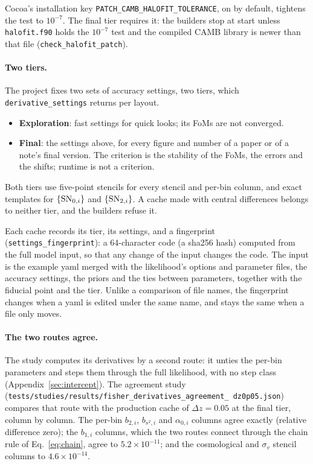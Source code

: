 \documentclass[11pt]{article}
\newcommand{\SNzi}{{\rm SN}_{0,i}}
\newcommand{\SNti}{{\rm SN}_{2,i}}
\newcommand{\us}{\_\allowbreak}
\begin{document}
Cocoa's installation key \texttt{PATCH\us CAMB\us HALOFIT\us TOLERANCE},
on by default, tightens the test to $10^{-7}$.  The final tier requires
it: the builders stop at start unless \texttt{halofit.f90} holds the
$10^{-7}$ test and the compiled CAMB library is newer than that file
(\texttt{check\us halofit\us patch}).

\paragraph{Two tiers.}
The project fixes two sets of accuracy settings, two tiers, which
\texttt{derivative\us settings} returns per layout.
\begin{itemize}
  \item \textbf{Exploration}: fast settings for quick looks; its FoMs
    are not converged.
  \item \textbf{Final}: the settings above, for every figure and number
    of a paper or of a note's final version.  The criterion is the
    stability of the FoMs, the errors and the shifts; runtime is not a
    criterion.
\end{itemize}
Both tiers use five-point stencils for every stencil and per-bin column,
and exact templates for $\{\SNzi\}$ and $\{\SNti\}$.
A cache made with central differences belongs to neither tier, and the
builders refuse it.

Each cache records its tier, its settings, and a fingerprint
(\texttt{settings\us fingerprint}): a 64-character code (a sha256 hash)
computed from the full model input, so that any change of the input
changes the code.  The input is the example yaml merged with the
likelihood's options and parameter files, the accuracy settings, the
priors and the ties between parameters, together with the fiducial point
and the tier.  Unlike a comparison of file names, the fingerprint changes
when a yaml is edited under the same name, and stays the same when a
file only moves.

\paragraph{The two routes agree.}
The study computes its derivatives by a second route: it unties the
per-bin parameters and steps them through the full likelihood, with no
step class (Appendix~\ref{sec:intercept}).  The agreement study
(\texttt{tests/studies/results/fisher\us derivatives\us agreement\us
dz0p05.json}) compares that route with the production cache of
$\Delta z = 0.05$ at the final tier, column by column.  The per-bin
$b_{2,i}$, $b_{s^2,i}$ and $\alpha_{0,i}$ columns agree exactly
(relative difference zero); the $b_{1,i}$ columns, which the two routes
connect through the chain rule of Eq.~\eqref{eq:chain}, agree to
$5.2\times10^{-11}$; and the cosmological and $\sigma_v$ stencil
columns to $4.6\times10^{-14}$.
\end{document}
